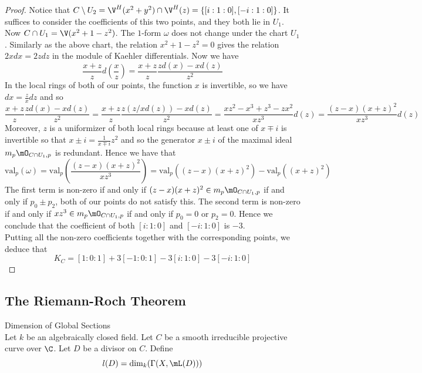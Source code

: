 \documentclass[a4paper]{article}
\begin{document}
\begin{eg}{}{}
\begin{proof}
Notice that $C\setminus U_2=\V^H(x^2+y^2)\cap\V^H(z)=\{[i:1:0],[-i:1:0]\}$. It suffices to consider the coefficients of this two points, and they both lie in $U_1$. Now $C\cap U_1=\V(x^2+1-z^2)$. The $1$-form $\omega$ does not change under the chart $U_1$. Similarly as the above chart, the relation $x^2+1-z^2=0$ gives the relation $2xdx=2zdz$ in the module of Kaehler differentials. Now we have $$\frac{x+z}{z}d\left(\frac{x}{z}\right)=\frac{x+z}{z}\frac{zd(x)-xd(z)}{z^2}$$ In the local rings of both of our points, the function $x$ is invertible, so we have $dx=\frac{z}{x}dz$ and so $$\frac{x+z}{z}\frac{zd(x)-xd(z)}{z^2}=\frac{x+z}{z}\frac{z(z/xd(z))-xd(z)}{z^2}=\frac{xz^2-x^3+z^3-zx^2}{xz^3}d(z)=\frac{(z-x)(x+z)^2}{xz^3}d(z)$$ Moreover, $z$ is a uniformizer of both local rings because at least one of $x\mp i$ is invertible so that $x\pm i=\frac{1}{x\mp i}z^2$ and so the generator $x\pm i$ of the maximal ideal $m_p\mO_{C\cap U_1,p}$ is redundant. Hence we have that $$\text{val}_p(\omega)=\text{val}_p\left(\frac{(z-x)(x+z)^2}{xz^3}\right)=\text{val}_p((z-x)(x+z)^2)-\text{val}_p((x+z)^2)$$ The first term is non-zero if and only if $(z-x)(x+z)^2\in m_p\mO_{C\cap U_1,p}$ if and only if $p_0\pm p_2$, both of our points do not satisfy this. The second term is non-zero if and only if $xz^3\in m_p\mO_{C\cap U_1,p}$ if and only if $p_0=0$ or $p_2=0$. Hence we conclude that the coefficient of both $[i:1:0]$ and $[-i:1:0]$ is $-3$. \\

Putting all the non-zero coefficients together with the corresponding points, we deduce that $$K_C=[1:0:1]+3[-1:0:1]-3[i:1:0]-3[-i:1:0]$$
\end{proof}
\end{eg}

\subsection{The Riemann-Roch Theorem}
\begin{defn}{Dimension of Global Sections}{}\\
Let $k$ be an algebraically closed field. Let $C$ be a smooth irreducible projective curve over $\C$. Let $D$ be a divisor on $C$. Define $$l(D)=\dim_k(\Gamma(X,\mL(D)))$$
\end{defn}
\end{document}

